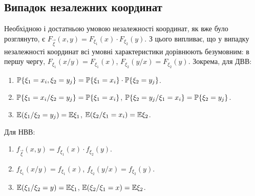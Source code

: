 
\subsection{Випадок незалежних координат}
Необхідною і достатньою умовою незалежності координат, як вже було розглянуто, є 
$F_{\vec{\xi}}(x, y) = F_{\xi_1}(x)\cdot F_{\xi_2}(y)$. З цього випливає,
що у випадку незалежності координат всі умовні характеристики дорівнюють безумовним: в першу чергу, 
$F_{\xi_1}(x/y) = F_{\xi_1}(x)$, $F_{\xi_2}(y/x) = F_{\xi_2}(y)$.
Зокрема, для ДВВ:
\begin{enumerate}
    \item $\P\{\xi_1 = x_i, \xi_2 = y_j\} = \P\{\xi_1 = x_i\}\cdot \P\{\xi_2 = y_j\}$.
    \item $\P\{\xi_1 = x_i / \xi_2 = y_j\} = \P\{\xi_1 = x_i\}$, $\P\{\xi_2 = y_j / \xi_1 = x_i\} = \P\{\xi_2 = y_j\}$.
    \item $\E(\xi_1 / \xi_2 = y_j) = \E\xi_1$, $\E(\xi_2 / \xi_1 = x_i) = \E\xi_2$.
\end{enumerate}
Для НВВ:
\begin{enumerate}
    \item $f_{\vec{\xi}}(x, y) = f_{\xi_1}(x)\cdot f_{\xi_2}(y)$.
    \item $f_{\xi_1}(x/y) = f_{\xi_1}(x)$, $f_{\xi_2}(y/x) = f_{\xi_2}(y)$.
    \item $\E(\xi_1 / \xi_2 = y) = \E\xi_1$, $\E(\xi_2 / \xi_1 = x) = \E\xi_2$.
\end{enumerate}